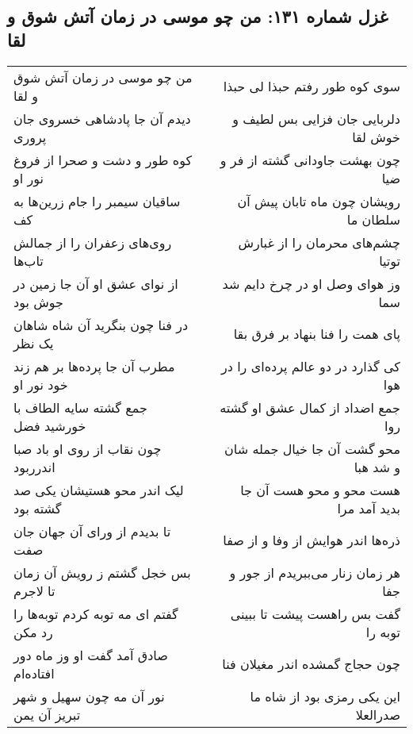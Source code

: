 \begin{center}
\section*{غزل شماره ۱۳۱: من چو موسی در زمان آتش شوق و لقا}
\label{sec:0131}
\begin{longtable}{l p{0.5cm} r}
من چو موسی در زمان آتش شوق و لقا
&&
سوی کوه طور رفتم حبذا لی حبذا
\\
دیدم آن جا پادشاهی خسروی جان پروری
&&
دلربایی جان فزایی بس لطیف و خوش لقا
\\
کوه طور و دشت و صحرا از فروغ نور او
&&
چون بهشت جاودانی گشته از فر و ضیا
\\
ساقیان سیمبر را جام زرین‌ها به کف
&&
رویشان چون ماه تابان پیش آن سلطان ما
\\
روی‌های زعفران را از جمالش تاب‌ها
&&
چشم‌های محرمان را از غبارش توتیا
\\
از نوای عشق او آن جا زمین در جوش بود
&&
وز هوای وصل او در چرخ دایم شد سما
\\
در فنا چون بنگرید آن شاه شاهان یک نظر
&&
پای همت را فنا بنهاد بر فرق بقا
\\
مطرب آن جا پرده‌ها بر هم زند خود نور او
&&
کی گذارد در دو عالم پرده‌ای را در هوا
\\
جمع گشته سایه الطاف با خورشید فضل
&&
جمع اضداد از کمال عشق او گشته روا
\\
چون نقاب از روی او باد صبا اندرربود
&&
محو گشت آن جا خیال جمله شان و شد هبا
\\
لیک اندر محو هستیشان یکی صد گشته بود
&&
هست محو و محو هست آن جا بدید آمد مرا
\\
تا بدیدم از ورای آن جهان جان صفت
&&
ذره‌ها اندر هوایش از وفا و از صفا
\\
بس خجل گشتم ز رویش آن زمان تا لاجرم
&&
هر زمان زنار می‌ببریدم از جور و جفا
\\
گفتم ای مه توبه کردم توبه‌ها را رد مکن
&&
گفت بس راهست پیشت تا ببینی توبه را
\\
صادق آمد گفت او وز ماه دور افتاده‌ام
&&
چون حجاج گمشده اندر مغیلان فنا
\\
نور آن مه چون سهیل و شهر تبریز آن یمن
&&
این یکی رمزی بود از شاه ما صدرالعلا
\\
\end{longtable}
\end{center}
